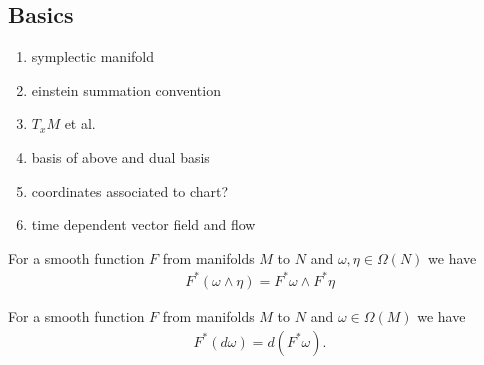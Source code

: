 \begin{appendix}

\section{Basics}

\begin{enumerate}
\item symplectic manifold
\item einstein summation convention
\item $T_x M$ et al.
\item basis of above and dual basis
\item coordinates associated to chart?
\item time dependent vector field and flow
\end{enumerate}


\begin{lemma}[refyan E.]
For a smooth function $F$ from manifolds $M$ to $N$ and $\omega,\eta \in \Omega(N)$ we have
\begin{align*}
F^*(\omega \wedge \eta) = F^* \omega \wedge F^* \eta
\end{align*}
\end{lemma}

\begin{lemma}[refyan E.203]
For a smooth function $F$ from manifolds $M$ to $N$ and $\omega \in \Omega(M)$ we have
\begin{align*}
F^*(d\omega) = d(F^* \omega).
\end{align*}
\end{lemma}


\end{appendix}

